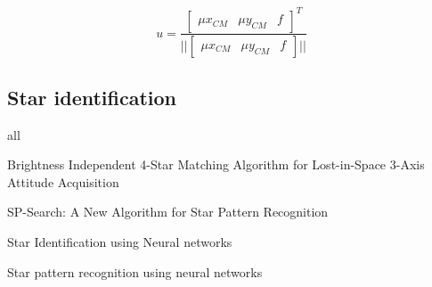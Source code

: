 \documentclass[12pt,a4paper,oneside]{article}
\begin{document}
\begin{equation}
u = \frac{
\begin{bmatrix}
\mu x_{CM} & \mu y_{CM} & f
\end{bmatrix}
^T}
{||
\begin{bmatrix}
\mu x_{CM} & \mu y_{CM} & f
\end{bmatrix}
||}
\end{equation}

\subsection{Star identification}
all \cite{spratling2009survey}\par
Brightness Independent 4-Star Matching Algorithm for Lost-in-Space 3-Axis Attitude Acquisition\cite{dong2006brightness} \par
SP-Search: A New Algorithm for Star Pattern Recognition \cite{mortari1999sp} \par
Star Identification using Neural networks \cite{miri2012star} \cite{lindbladstar} \par
Star pattern recognition using neural networks \cite{li2003star} \par
\end{document}
